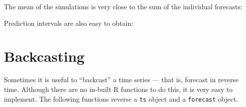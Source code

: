 \documentclass[]{book}
\newenvironment{Shaded}{\begin{snugshade}}{\end{snugshade}}
\newcommand{\CommentTok}[1]{\textcolor[rgb]{0.56,0.35,0.01}{\textit{#1}}}
\newcommand{\DataTypeTok}[1]{\textcolor[rgb]{0.13,0.29,0.53}{#1}}
\newcommand{\DecValTok}[1]{\textcolor[rgb]{0.00,0.00,0.81}{#1}}
\newcommand{\FloatTok}[1]{\textcolor[rgb]{0.00,0.00,0.81}{#1}}
\newcommand{\KeywordTok}[1]{\textcolor[rgb]{0.13,0.29,0.53}{\textbf{#1}}}
\newcommand{\NormalTok}[1]{#1}
\newcommand{\OperatorTok}[1]{\textcolor[rgb]{0.81,0.36,0.00}{\textbf{#1}}}
\begin{document}
The mean of the simulations is very close to the sum of the individual forecasts:

\begin{Shaded}
\end{Shaded}

Prediction intervals are also easy to obtain:

\begin{Shaded}
\end{Shaded}

\hypertarget{backcasting}{%
\section{Backcasting}\label{backcasting}}

Sometimes it is useful to ``backcast'' a time series --- that is, forecast in reverse time. Although there are no in-built R functions to do this, it is very easy to implement. The following functions reverse a \texttt{ts} object and a \texttt{forecast} object.
\end{document}
